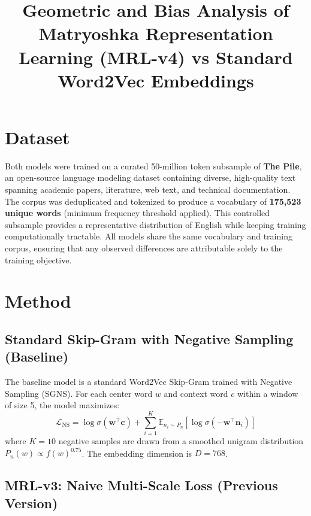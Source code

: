 \documentclass[11pt,a4paper]{article}
\title{Geometric and Bias Analysis of Matryoshka Representation Learning (MRL-v4) vs Standard Word2Vec Embeddings}
\author{}
\date{}
\begin{document}
\maketitle

\section{Dataset}

Both models were trained on a curated 50-million token subsample of \textbf{The Pile}, an open-source language modeling dataset containing diverse, high-quality text spanning academic papers, literature, web text, and technical documentation. The corpus was deduplicated and tokenized to produce a vocabulary of \textbf{175,523 unique words} (minimum frequency threshold applied). This controlled subsample provides a representative distribution of English while keeping training computationally tractable. All models share the same vocabulary and training corpus, ensuring that any observed differences are attributable solely to the training objective.

\section{Method}

\subsection{Standard Skip-Gram with Negative Sampling (Baseline)}

The baseline model is a standard Word2Vec Skip-Gram trained with Negative Sampling (SGNS). For each center word $w$ and context word $c$ within a window of size 5, the model maximizes:
\begin{equation}
\mathcal{L}_{\text{NS}} = \log \sigma(\mathbf{w}^\top \mathbf{c}) + \sum_{i=1}^{K} \mathbb{E}_{n_i \sim P_n} \left[\log \sigma(-\mathbf{w}^\top \mathbf{n}_i)\right]
\end{equation}
where $K=10$ negative samples are drawn from a smoothed unigram distribution $P_n(w) \propto f(w)^{0.75}$. The embedding dimension is $D=768$.

\subsection{MRL-v3: Naive Multi-Scale Loss (Previous Version)}
\end{document}
